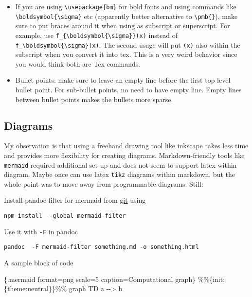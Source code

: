 \documentclass[
]{article}
\newenvironment{Shaded}{}{}
\newcommand{\NormalTok}[1]{#1}
\begin{document}
\begin{itemize}
\item
  If you are using \texttt{\textbackslash{}usepackage\{bm\}} for bold
  fonts and using commands like
  \texttt{\textbackslash{}boldsymbol\{\textbackslash{}sigma\}} etc
  (apparently better alternative to \texttt{\textbackslash{}pmb\{\}}),
  make sure to put braces around it when using as subscript or
  superscript. For example, use
  \texttt{f\_\{\textbackslash{}boldsymbol\{\textbackslash{}sigma\}\}(x)}
  instead of
  \texttt{f\_\textbackslash{}boldsymbol\{\textbackslash{}sigma\}(x)}.
  The second usage will put \texttt{(x)} also within the subscript when
  you convert it into tex. This is a very weird behavior since you would
  think both are Tex commands.
\item
  Bullet points: make sure to leave an empty line before the first top
  level bullet point. For sub-bullet points, no need to have empty line.
  Empty lines between bullet points makes the bullets more sparse.
\end{itemize}

\hypertarget{diagrams}{%
\subsection{Diagrams}\label{diagrams}}

My observation is that using a freehand drawing tool like inkscape takes
less time and provides more flexibility for creating diagrams.
Markdown-friendly tools like \texttt{mermaid} required additional set up
and does not seem to support latex within diagram. Maybe once can use
latex \texttt{tikz} diagrams within markdown, but the whole point was to
move away from programmable diagrams. Still:

Install pandoc filter for mermaid from
\href{https://github.com/raghur/mermaid-filter?tab=readme-ov-file}{git}
using

\begin{verbatim}
npm install --global mermaid-filter
\end{verbatim}

Use it with \texttt{-F} in pandoc

\begin{verbatim}
pandoc  -F mermaid-filter something.md -o something.html 
\end{verbatim}

A sample block of code

\begin{Shaded}
\begin{Highlighting}[]
\NormalTok{\textasciigrave{}\textasciigrave{}\textasciigrave{}\{.mermaid format=png scale=5 caption=\textquotesingle{}Computational graph\textquotesingle{}\}}
\NormalTok{\%\%\{init: \{\textquotesingle{}theme\textquotesingle{}:\textquotesingle{}neutral\textquotesingle{}\}\}\%\%}
\NormalTok{  graph TD}
\NormalTok{    a {-}{-}\textgreater{} b}
\end{Highlighting}
\end{Shaded}
\end{document}
